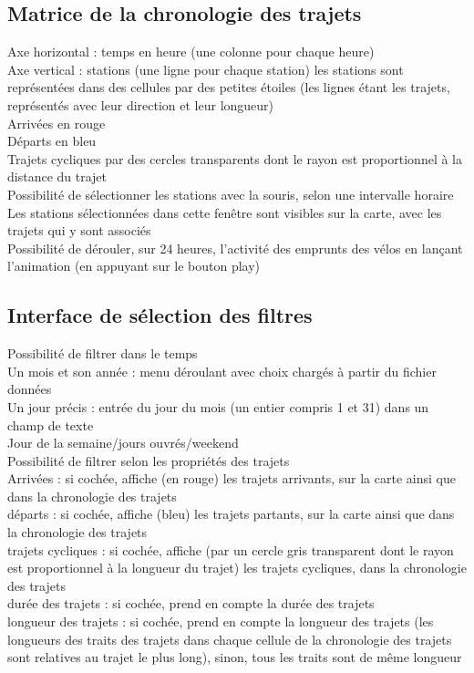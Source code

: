 \documentclass[12pt]{article}
\begin{document}
		\subsection{Matrice de la chronologie des trajets}
		Axe horizontal : temps en heure (une colonne pour chaque heure)\\
		Axe vertical : stations (une ligne pour chaque station) les stations sont représentées dans
		des cellules par des petites étoiles (les lignes étant les trajets, représentés
		avec leur direction et leur longueur)\\
		Arrivées en rouge\\
		Départs en bleu\\
		Trajets cycliques par des cercles transparents dont le rayon est proportionnel à
		la distance du trajet\\
		Possibilité de sélectionner les stations avec la souris, selon une intervalle horaire
		Les stations sélectionnées dans cette fenêtre sont visibles sur la carte, avec
		les trajets qui y sont associés\\
		Possibilité de dérouler, sur 24 heures, l’activité des emprunts des vélos
		en lançant l’animation (en appuyant sur le bouton play)\\
		
		\subsection{Interface de sélection des filtres}
		Possibilité de filtrer dans le temps\\
		Un mois et son année : menu déroulant avec choix chargés à partir du fichier
		données\\
		Un jour précis : entrée du jour du mois (un entier compris 1 et 31) dans un champ
		de texte\\
		Jour de la semaine/jours ouvrés/weekend\\
		Possibilité de filtrer selon les propriétés des trajets\\
		Arrivées : si cochée, affiche (en rouge) les trajets arrivants, sur la carte ainsi
		que dans la chronologie des trajets\\
		départs : si cochée, affiche (bleu) les trajets partants, sur la carte ainsi que
		dans la chronologie des trajets\\
		trajets cycliques : si cochée, affiche (par un cercle gris transparent dont le
		rayon est proportionnel à la longueur du trajet) les trajets cycliques, dans la
		chronologie des trajets\\
		durée des trajets : si cochée, prend en compte la durée des trajets\\
		longueur des trajets : si cochée, prend en compte la longueur des trajets
		(les longueurs des traits des trajets dans chaque cellule de la chronologie des
		trajets sont relatives au trajet le plus long), sinon, tous les traits sont
		de même longueur\\
		
\end{document}
